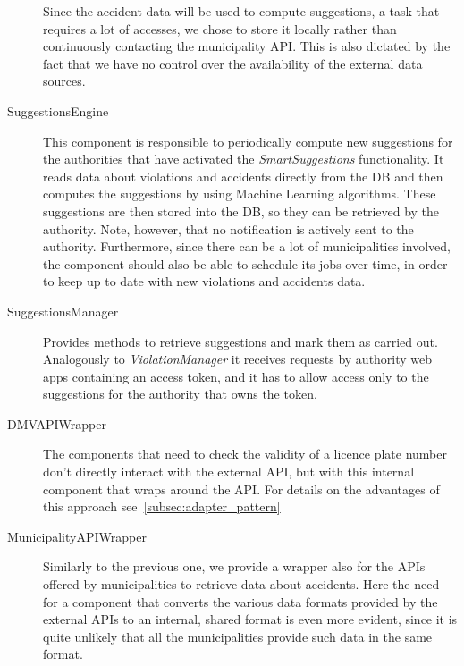 \begin{description}
    Since the accident data will be used to compute suggestions, a task that
    requires a lot of accesses, we chose to store it locally rather than
    continuously contacting the municipality API. This is also dictated by
    the fact that we have no control over the availability of the external
    data sources.
    \item[SuggestionsEngine] This component is responsible to periodically
    compute new suggestions for the authorities that have activated the
    \emph{SmartSuggestions} functionality.
    It reads data about violations and accidents directly from the DB and
    then computes the suggestions by using Machine Learning algorithms.
    These suggestions are then stored into the DB, so they can be retrieved
    by the authority. Note, however, that no notification is actively sent to
    the authority.
    Furthermore, since there can be a lot of municipalities involved, the
    component should also be able to schedule its jobs over time, in order to
    keep up to date with new violations and accidents data.
    \item[SuggestionsManager] Provides methods to retrieve suggestions and
    mark them as carried out. Analogously to \emph{ViolationManager} it receives
    requests by authority web apps containing an access token, and it has to
    allow access only to the suggestions for the authority that owns the token.
    \item[DMVAPIWrapper] The components that need to check the validity of
    a licence plate number don't directly interact with the external API, but
    with this internal component that wraps around the API.
    For details on the advantages of this approach
    see~\ref{subsec:adapter_pattern}
    \item[MunicipalityAPIWrapper] Similarly to the previous one, we provide a
    wrapper also for the APIs offered by municipalities to retrieve data about
    accidents. Here the need for a component that converts the various data
    formats provided by the external APIs to an internal, shared format is
    even more evident, since it is quite unlikely that all the municipalities
    provide such data in the same format.
\end{description}